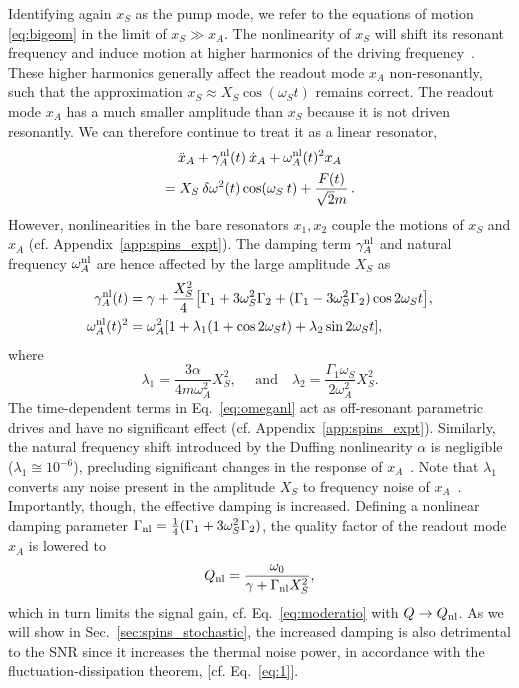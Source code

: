 Identifying again $x_S$ as the pump mode, we refer to the equations of motion \eqref{eq:bigeom} in the limit of $x_S \gg x_A$. The nonlinearity of $x_S$ will shift its resonant frequency and induce motion at higher harmonics of the driving frequency~\cite{Rand_2005}. These higher harmonics generally affect the readout mode $x_A$ non-resonantly, such that the approximation $x_S \approx X_S \cos(\omega_S t)$ remains correct. The readout mode $x_A$ has a much smaller amplitude than $x_S$ because it is not driven resonantly. We can therefore continue to treat it as a linear resonator,
\begin{equation} \label{xasimp}
\begin{gathered}
\ddot{x}_A + 
\gamma^{\rm {nl}}_A(t)\:  \dot{x}_A 
+ \omega^{\rm {nl}}_A (t)^2 x_A \\
= X_S \: \delta \omega^2(t) \cos(\omega_S \: t)+ \frac{F(t)}{\sqrt{2} m}\,.
\end{gathered}
\end{equation}
However, nonlinearities in the bare resonators $x_1, x_2$ couple the motions of $x_S$ and $x_A$ (cf. Appendix~\ref{app:spins_expt}). The damping term $\gamma^{\rm {nl}}_A$ and natural frequency $\omega^{\rm {nl}}_A$ are hence affected by the large amplitude $X_S$ as 
\begin{align} \label{eq:omeganl}
\begin{split}
\gamma^{\rm {nl}}_A(t) &= \gamma + \frac{X_S^2}{4} \big[\Gamma_1 + 3 \omega_S^2 \Gamma_2 +(\Gamma_1 - 3 \omega_S^2 \Gamma_2) \cos{2 \omega_S t}\big],\\
\omega^{\rm {nl}}_A(t)^2 &= \omega_A^2[1+\lambda_1 (1 + \cos{2 \omega_S t}) + \lambda_2\sin{2 \omega_S t}],
\end{split}
\end{align}
where
\begin{equation} \label{eq:lambdas}
\lambda_1 = \frac{3 \alpha}{4 m \omega_A^2} X_S^2,\quad \text{ and} \quad \lambda_2 = \frac{\Gamma_1 \omega_S}{2 \omega_A^2} X_S^2 .
\end{equation}
The time-dependent terms in Eq.~\eqref{eq:omeganl} act as off-resonant parametric drives and have no significant effect (cf. Appendix~\ref{app:spins_expt}). Similarly, the natural frequency shift introduced by the Duffing nonlinearity $\alpha$ is negligible ($\lambda_1 \cong 10^{-6}$), precluding significant changes in the response of $x_A$~\cite{Lifshitz_2003}. Note that $\lambda_1$ converts any noise present in the amplitude $X_S$ to frequency noise of $x_A$~\cite{Kenig_2012}. Importantly, though, the effective damping is increased. Defining a nonlinear damping parameter $\Gamma_{\rm nl} = \frac{1}{4} (\Gamma_1 + 3 \omega_S^2 \Gamma_2)$, the quality factor of the readout mode $x_A$ is lowered to
\begin{equation} \label{Qnl}
Q_{\rm nl} = \frac{\omega_0}{\gamma + \Gamma_{\rm nl} X_S^2},
\end{equation}
which in turn limits the signal gain, cf. Eq.~\eqref{eq:moderatio} with $Q\rightarrow{Q}_{\rm nl}$. As we will show in Sec.~\ref{sec:spins_stochastic}, the increased damping is also detrimental to the SNR since it increases the thermal noise power, in accordance with the fluctuation-dissipation theorem, [cf. Eq.~\eqref{eq:1}].

